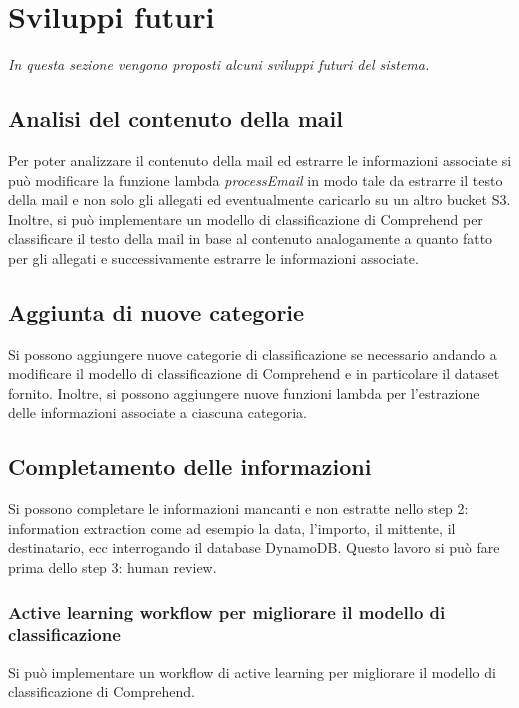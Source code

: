\chapter{Sviluppi futuri}
\emph{In questa sezione vengono proposti alcuni sviluppi futuri del sistema.}
\section{Analisi del contenuto della mail}
Per poter analizzare il contenuto della mail ed estrarre le informazioni associate si può modificare la funzione lambda \textit{processEmail} in modo tale da estrarre il testo della mail e non solo gli allegati ed eventualmente caricarlo su un altro bucket S3.\\
Inoltre, si può implementare un modello di classificazione di Comprehend per classificare il testo della mail in base al contenuto analogamente a quanto fatto per gli allegati e successivamente estrarre le informazioni associate. 
\section{Aggiunta di nuove categorie}
Si possono aggiungere nuove categorie di classificazione se necessario andando a modificare il modello di classificazione di Comprehend e in particolare il dataset fornito. Inoltre, si possono aggiungere nuove funzioni lambda per l'estrazione delle informazioni associate a ciascuna categoria.
\section{Completamento delle informazioni}
Si possono completare le informazioni mancanti e non estratte nello step 2: information extraction come ad esempio la data, l'importo, il mittente, il destinatario, ecc interrogando il database DynamoDB. Questo lavoro si può fare prima dello step 3: human review. 
\subsection{Active learning workflow per migliorare il modello di classificazione}


Si può implementare un workflow di active learning per migliorare il modello di classificazione di Comprehend.

